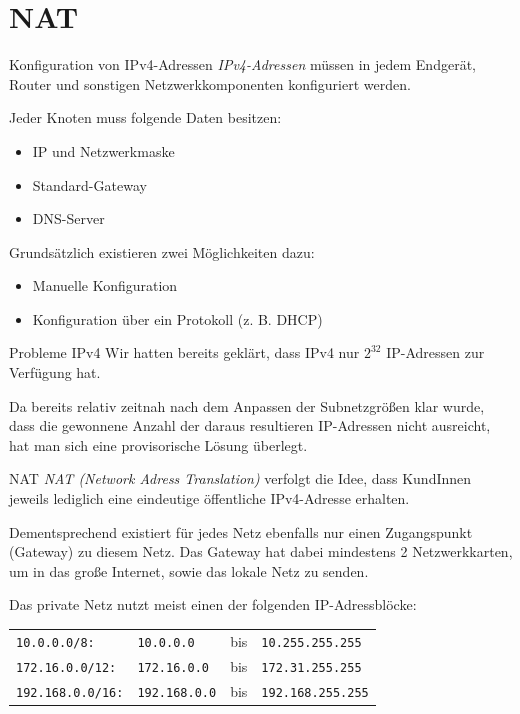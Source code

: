 \section{NAT}

\begin{bonus}{Konfiguration von IPv4-Adressen}
    \emph{IPv4-Adressen} müssen in jedem Endgerät, Router und sonstigen Netzwerkkomponenten konfiguriert werden.

    Jeder Knoten muss folgende Daten besitzen:
    \begin{itemize}
        \item IP und Netzwerkmaske
        \item Standard-Gateway
        \item DNS-Server
    \end{itemize}

    Grundsätzlich existieren zwei Möglichkeiten dazu:
    \begin{itemize}
        \item Manuelle Konfiguration
        \item Konfiguration über ein Protokoll (z. B. DHCP)
    \end{itemize}
\end{bonus}

\begin{bonus}{Probleme IPv4}
    Wir hatten bereits geklärt, dass IPv4 nur $2^{32}$ IP-Adressen zur Verfügung hat.

    Da bereits relativ zeitnah nach dem Anpassen der Subnetzgrößen klar wurde, dass die gewonnene Anzahl der daraus resultieren IP-Adressen nicht ausreicht, hat man sich eine provisorische Lösung überlegt.
\end{bonus}

\begin{defi}{NAT}
    \emph{NAT (Network Adress Translation)} verfolgt die Idee, dass KundInnen jeweils lediglich eine eindeutige öffentliche IPv4-Adresse erhalten.

    Dementsprechend existiert für jedes Netz ebenfalls nur einen Zugangspunkt (Gateway) zu diesem Netz.
    Das Gateway hat dabei mindestens 2 Netzwerkkarten, um in das große Internet, sowie das lokale Netz zu senden.

    Das private Netz nutzt meist einen der folgenden IP-Adressblöcke:

    \begin{tabular}{llcl}
        \texttt{10.0.0.0/8:}     & \texttt{10.0.0.0}    & bis & \texttt{10.255.255.255}  \\
        \texttt{172.16.0.0/12:}  & \texttt{172.16.0.0}  & bis & \texttt{172.31.255.255}  \\
        \texttt{192.168.0.0/16:} & \texttt{192.168.0.0} & bis & \texttt{192.168.255.255}
    \end{tabular}
\end{defi}


